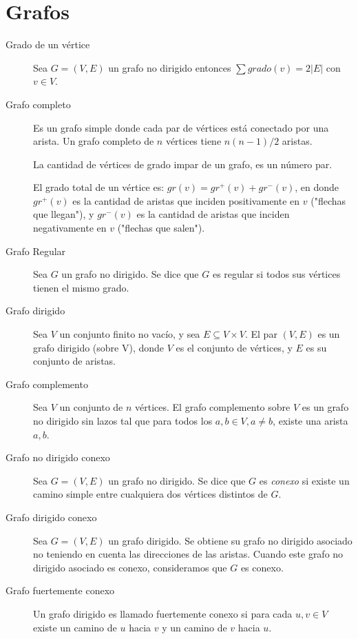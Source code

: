 \documentclass[a4paper, twoside]{article}
\begin{document}
\section{Grafos}
\begin{description}

        \item[Grado de un vértice] Sea $G = (V,E)$ un grafo no dirigido
        entonces $\sum grado(v) = 2 |E|$ con $v \in V$.
        \item[Grafo completo] Es un grafo simple donde cada par de vértices 
        está conectado por una arista. Un grafo completo de $n$ vértices 
        tiene $n(n-1)/2$ aristas. 
        
        La cantidad de vértices de grado impar de un grafo, es un número par.

        El grado total de un vértice es: $gr(v) = gr^{+}(v) + gr^{-}(v) $, en donde
        $gr^{+}(v)$ es la cantidad de aristas que inciden positivamente en $v$ ("flechas que llegan"), y
        $gr^{-}(v)$ es la cantidad de aristas que inciden negativamente en $v$ ("flechas que salen").

        \item[Grafo Regular] Sea $G$ un grafo no dirigido. Se dice que $G$ es
        regular si todos sus vértices tienen el mismo grado.

	\item[Grafo dirigido] Sea $V$ un conjunto finito no vacío, y sea 
	$E \subseteq V \times V$. El par $(V,E)$ es un grafo dirigido (sobre V),
	donde $V$ es el conjunto de vértices, y $E$ es su conjunto de aristas.
	
	\item[Grafo complemento] Sea $V$ un conjunto de $n$ vértices. El grafo
	complemento sobre $V$ es un grafo no dirigido sin lazos tal que para 
	todos los $a,b \in V, a \neq b$, existe una arista ${a,b}$.

	\item[Grafo no dirigido conexo] Sea $G = (V,E)$ un grafo no dirigido. Se dice que $G$ 
	es \emph{conexo} si existe un camino simple entre cualquiera dos vértices 
	distintos de $G$.

	\item[Grafo dirigido conexo] Sea $G = (V,E)$ un grafo dirigido. Se obtiene 
	su grafo no dirigido asociado no teniendo en cuenta las direcciones de las 
	aristas. Cuando este grafo no dirigido asociado es conexo, consideramos que
	$G$ es conexo.

        \item[Grafo fuertemente conexo] Un grafo dirigido es llamado fuertemente conexo
        si para cada $u,v \in V$ existe un camino de $u$ hacia $v$ y un camino de 
        $v$ hacia $u$.


\end{description}
\end{document}
